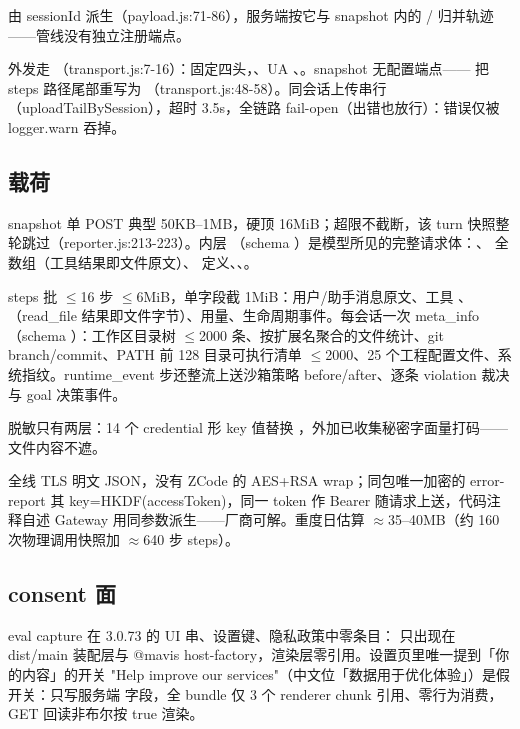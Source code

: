  由 sessionId 派生（payload.js:71-86），服务端按它与 snapshot 内的 / 归并轨迹——管线没有独立注册端点。

外发走 （transport.js:7-16）：固定四头，、UA 、。snapshot 无配置端点—— 把 steps 路径尾部重写为 （transport.js:48-58）。同会话上传串行（uploadTailBySession），超时 3.5s，全链路 fail-open（出错也放行）：错误仅被 logger.warn 吞掉。

\subsection{载荷}

snapshot 单 POST 典型 50KB–1MB，硬顶 16MiB；超限不截断，该 turn 快照整轮跳过（reporter.js:213-223）。内层 （schema ）是模型所见的完整请求体：、 全数组（工具结果即文件原文）、 定义、、。

steps 批 $\le$16 步 $\le$6MiB，单字段截 1MiB：用户/助手消息原文、工具 、（read\_file 结果即文件字节）、用量、生命周期事件。每会话一次 meta\_info（schema ）：工作区目录树 $\le$2000 条、按扩展名聚合的文件统计、git branch/commit、PATH 前 128 目录可执行清单 $\le$2000、25 个工程配置文件、系统指纹。runtime\_event 步还整流上送沙箱策略 before/after、逐条 violation 裁决与 goal 决策事件。

脱敏只有两层：14 个 credential 形 key 值替换 \ep{[REDACTED]}，外加已收集秘密字面量打码——文件内容不遮。

全线 TLS 明文 JSON，没有 ZCode 的 AES+RSA wrap；同包唯一加密的 error-report 其 key=HKDF(accessToken)，同一 token 作 Bearer 随请求上送，代码注释自述 Gateway 用同参数派生——厂商可解。重度日估算 $\approx$35–40MB（约 160 次物理调用快照加 $\approx$640 步 steps）。

\subsection{consent 面}

eval capture 在 3.0.73 的 UI 串、设置键、隐私政策中零条目： 只出现在 dist/main 装配层与 @mavis host-factory，渲染层零引用。设置页里唯一提到「你的内容」的开关 "Help improve our services"（中文位「数据用于优化体验」）是假开关：只写服务端  字段，全 bundle 仅 3 个 renderer chunk 引用、零行为消费，GET 回读非布尔按 true 渲染。

